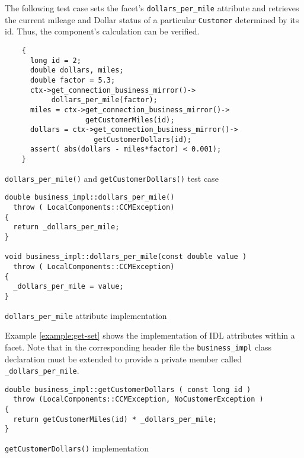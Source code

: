 The following test case sets the facet's {\tt dollars\_per\_mile} attribute
and retrieves the current mileage and Dollar status of a particular 
{\tt Customer} determined by its id.
Thus, the component's calculation can be verified.

\begin{Example}
\begin{minifbox}
\begin{small}
\begin{verbatim}
    {
      long id = 2;
      double dollars, miles;
      double factor = 5.3;
      ctx->get_connection_business_mirror()->
           dollars_per_mile(factor);
      miles = ctx->get_connection_business_mirror()->
                   getCustomerMiles(id);
      dollars = ctx->get_connection_business_mirror()->
                     getCustomerDollars(id); 
      assert( abs(dollars - miles*factor) < 0.001);
    }
\end{verbatim}
\end{small}
\end{minifbox}
\caption{{\tt dollars\_per\_mile()} and {\tt getCustomerDollars()} test case}
\label{example:}
\end{Example}


\begin{Example}
\begin{minifbox}
\begin{small}
\begin{verbatim}
double business_impl::dollars_per_mile()
  throw ( LocalComponents::CCMException)
{
  return _dollars_per_mile;
}

void business_impl::dollars_per_mile(const double value )
  throw ( LocalComponents::CCMException)
{
  _dollars_per_mile = value;
}
\end{verbatim}
\end{small}
\end{minifbox}
\caption{{\tt dollars\_per\_mile} attribute implementation}
\label{example:get-set}
\end{Example}

Example \ref{example:get-set} shows the implementation of IDL attributes within a facet.
Note that in the corresponding header file the {\tt business\_impl} class declaration must 
be extended to provide a private member called {\tt \_dollars\_per\_mile}. 

\begin{Example}
\begin{minifbox}
\begin{small}
\begin{verbatim}
double business_impl::getCustomerDollars ( const long id )
  throw (LocalComponents::CCMException, NoCustomerException )
{
  return getCustomerMiles(id) * _dollars_per_mile;
}
\end{verbatim}
\end{small}
\end{minifbox}
\caption{{\tt getCustomerDollars()} implementation}
\label{example:getCustomerDollars}
\end{Example}

